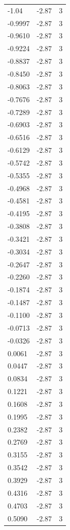\begin{longtable}{lrr}
  -1.04 & -2.87 & 3 \\
  -0.9997 & -2.87 & 3 \\
  -0.9610 & -2.87 & 3 \\
  -0.9224 & -2.87 & 3 \\
  -0.8837 & -2.87 & 3 \\
  -0.8450 & -2.87 & 3 \\
  -0.8063 & -2.87 & 3 \\
  -0.7676 & -2.87 & 3 \\
  -0.7289 & -2.87 & 3 \\
  -0.6903 & -2.87 & 3 \\
  -0.6516 & -2.87 & 3 \\
  -0.6129 & -2.87 & 3 \\
  -0.5742 & -2.87 & 3 \\
  -0.5355 & -2.87 & 3 \\
  -0.4968 & -2.87 & 3 \\
  -0.4581 & -2.87 & 3 \\
  -0.4195 & -2.87 & 3 \\
  -0.3808 & -2.87 & 3 \\
  -0.3421 & -2.87 & 3 \\
  -0.3034 & -2.87 & 3 \\
  -0.2647 & -2.87 & 3 \\
  -0.2260 & -2.87 & 3 \\
  -0.1874 & -2.87 & 3 \\
  -0.1487 & -2.87 & 3 \\
  -0.1100 & -2.87 & 3 \\
  -0.0713 & -2.87 & 3 \\
  -0.0326 & -2.87 & 3 \\
  0.0061 & -2.87 & 3 \\
  0.0447 & -2.87 & 3 \\
  0.0834 & -2.87 & 3 \\
  0.1221 & -2.87 & 3 \\
  0.1608 & -2.87 & 3 \\
  0.1995 & -2.87 & 3 \\
  0.2382 & -2.87 & 3 \\
  0.2769 & -2.87 & 3 \\
  0.3155 & -2.87 & 3 \\
  0.3542 & -2.87 & 3 \\
  0.3929 & -2.87 & 3 \\
  0.4316 & -2.87 & 3 \\
  0.4703 & -2.87 & 3 \\
  0.5090 & -2.87 & 3 \\

\end{longtable}
